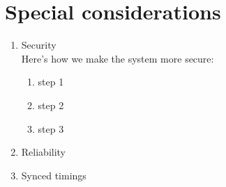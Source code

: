 \documentclass[letterpaper]{article}
\begin{document}
\section{Special considerations}

\begin{enumerate}
 \item Security\\
       Here's how we make the system more secure:
       \begin{enumerate}
        \item step 1
        \item step 2
        \item step 3
       \end{enumerate}
 \item Reliability
 \item Synced timings
\end{enumerate}
\end{document}
